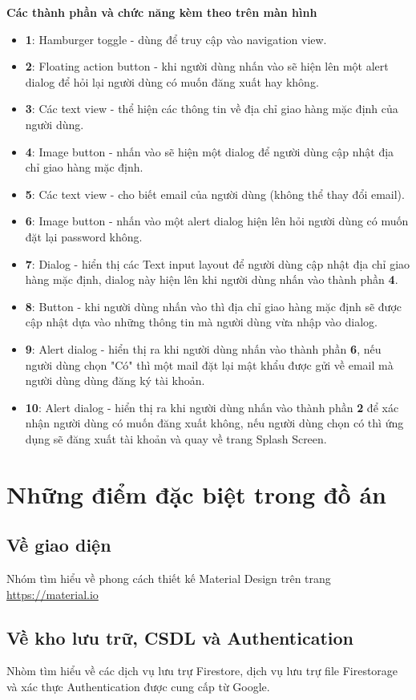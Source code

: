 \documentclass[12pt]{article}
\begin{document}
\indent \textbf{Các thành phần và chức năng kèm theo trên màn hình}
\begin{itemize}
    \item \textbf{1}: Hamburger toggle - dùng để truy cập vào navigation view.
    \item \textbf{2}: Floating action button - khi người dùng nhấn vào sẽ hiện lên một alert dialog để hỏi lại người dùng có muốn đăng xuất hay không. 
    \item \textbf{3}: Các text view - thể hiện các thông tin về địa chỉ giao hàng mặc định của người dùng.
    \item \textbf{4}: Image button - nhấn vào sẽ hiện một dialog để người dùng cập nhật địa chỉ giao hàng mặc định.
    \item \textbf{5}: Các text view - cho biết email của người dùng (không thể thay đổi email).
    \item \textbf{6}: Image button - nhấn vào một alert dialog hiện lên hỏi người dùng có muốn đặt lại password không.
    \item \textbf{7}: Dialog - hiển thị các Text input layout để người dùng cập nhật địa chỉ giao hàng mặc định, dialog này hiện lên khi người dùng nhấn vào thành phần \textbf{4}.
    \item \textbf{8}: Button - khi người dùng nhấn vào thì địa chỉ giao hàng mặc định sẽ được cập nhật dựa vào những thông tin mà người dùng vừa nhập vào dialog.
    \item \textbf{9}: Alert dialog - hiển thị ra khi người dùng nhấn vào thành phần \textbf{6}, nếu người dùng chọn "Có" thì một mail đặt lại mật khẩu được gửi về email mà người dùng dùng đăng ký tài khoản.
    \item \textbf{10}: Alert dialog - hiển thị ra khi người dùng nhấn vào thành phần \textbf{2} để xác nhận người dùng có muốn đăng xuất không, nếu người dùng chọn có thì ứng dụng sẽ đăng xuất tài khoản và quay về trang Splash Screen.
\end{itemize}

\section{Những điểm đặc biệt trong đồ án}
\subsection{Về giao diện}
Nhóm tìm hiểu về phong cách thiết kế Material Design trên trang \url{https://material.io}

\subsection{Về kho lưu trữ, CSDL và Authentication}
Nhòm tìm hiểu về các dịch vụ lưu trự Firestore, dịch vụ lưu trự file Firestorage và xác thực Authentication được cung cấp từ Google.
\end{document}
